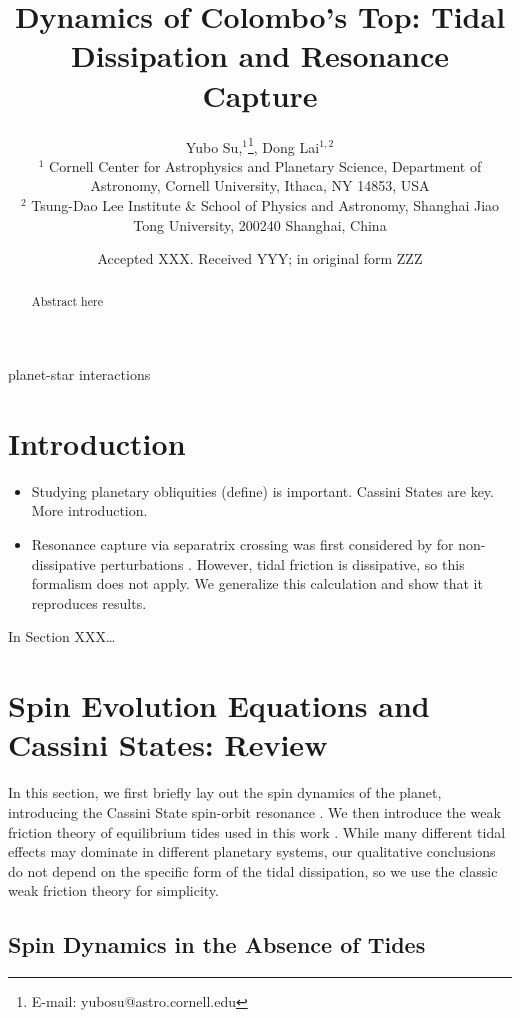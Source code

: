 \documentclass[
        fleqn,
        usenatbib,
    ]{mnras}
\title[Weak Tides and Cassini States]{Dynamics of Colombo's Top: Tidal
Dissipation and Resonance Capture}
\author[Y. Su and D. Lai.]{
Yubo Su,$^1$\thanks{E-mail: yubosu@astro.cornell.edu},
Dong Lai$^{1,2}$
\\
$^1$ Cornell Center for Astrophysics and Planetary Science, Department of
Astronomy, Cornell University, Ithaca, NY 14853, USA\\
$^2$ Tsung-Dao Lee Institute \& School of Physics and Astronomy, Shanghai Jiao
Tong University, 200240 Shanghai, China
}
\date{Accepted XXX\@. Received YYY\@; in original form ZZZ}
\begin{document}
\label{firstpage}
\pagerange{\pageref{firstpage}--\pageref{lastpage}}
\maketitle

\begin{abstract}
    Abstract here
\end{abstract}

\begin{keywords}
planet-star interactions
\end{keywords}

\section{Introduction}\label{s:intro}

\begin{itemize}
    \item Studying planetary obliquities (define) is important. Cassini States
        are key. More introduction.

    \item Resonance capture via separatrix crossing was first considered by
        \citep{henrard1982} for non-dissipative perturbations
        \citep[e.g.][]{su2020}. However, tidal friction is dissipative, so this
        formalism does not apply. We generalize this calculation and show that
        it reproduces results.
\end{itemize}

In Section XXX\dots

\section{Spin Evolution Equations and Cassini States: Review}\label{s:theory}

In this section, we first briefly lay out the spin dynamics of the planet,
introducing the Cassini State spin-orbit resonance \citep[for more details,
see][]{su2020}. We then introduce the weak friction theory of equilibrium tides
used in this work \citep{lai2012}. While many different tidal effects may
dominate in different planetary systems, our qualitative conclusions do not
depend on the specific form of the tidal dissipation, so we use the classic weak
friction theory for simplicity.

\subsection{Spin Dynamics in the Absence of Tides}\label{ss:theory_spin}
\end{document}
